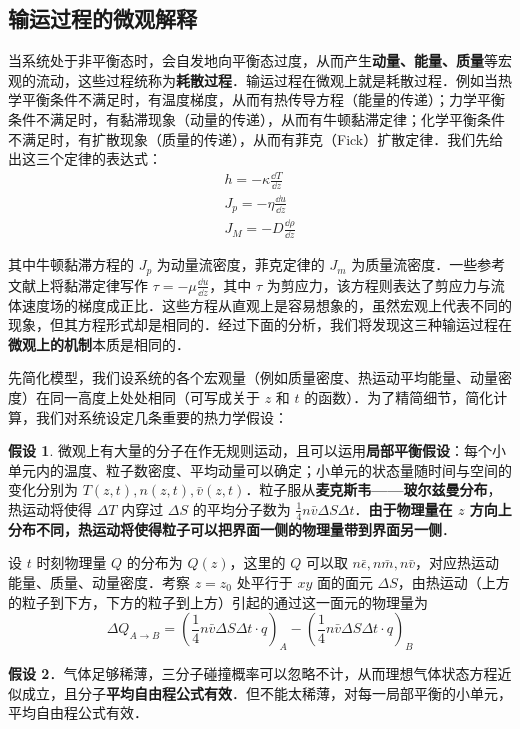 \subsection{输运过程的微观解释}
当系统处于非平衡态时，会自发地向平衡态过度，从而产生\textbf{动量、能量、质量}等宏观的流动，这些过程统称为\textbf{耗散过程}．输运过程在微观上就是耗散过程．例如当热学平衡条件不满足时，有温度梯度，从而有热传导方程（能量的传递）；力学平衡条件不满足时，有黏滞现象（动量的传递），从而有牛顿黏滞定律；化学平衡条件不满足时，有扩散现象（质量的传递），从而有菲克（Fick）扩散定律．我们先给出这三个定律的表达式：
\begin{align}
h=-\kappa \frac{\dd T}{\dd z}\\
J_p=-\eta \frac{\dd u}{\dd z}\\
J_M=-D\frac{\dd \rho}{\dd z}
\end{align}

其中牛顿黏滞方程的 $J_p$ 为动量流密度，菲克定律的 $J_m$ 为质量流密度．一些参考文献上将黏滞定律写作 $\tau = -\mu \frac{\dd u}{\dd z}$，其中 $\tau$ 为剪应力，该方程则表达了剪应力与流体速度场的梯度成正比．这些方程从直观上是容易想象的，虽然宏观上代表不同的现象，但其方程形式却是相同的．经过下面的分析，我们将发现这三种输运过程在\textbf{微观上的机制}本质是相同的．

先简化模型，我们设系统的各个宏观量（例如质量密度、热运动平均能量、动量密度）在同一高度上处处相同（可写成关于 $z$ 和 $t$ 的函数）．为了精简细节，简化计算，我们对系统设定几条重要的热力学假设：

\textbf{假设 1}. 微观上有大量的分子在作无规则运动，且可以运用\textbf{局部平衡假设}：每个小单元内的温度、粒子数密度、平均动量可以确定；小单元的状态量随时间与空间的变化分别为 $T(z,t),n(z,t),\bar v(z,t)$．粒子服从\textbf{麦克斯韦——玻尔兹曼分布}，热运动将使得 $\Delta T$ 内穿过 $\Delta S$ 的平均分子数为 $\frac{1}{4}n\bar v \Delta S\Delta t$．\textbf{由于物理量在 $z$ 方向上分布不同，热运动将使得粒子可以把界面一侧的物理量带到界面另一侧}．

设 $t$ 时刻物理量 $Q$ 的分布为 $Q(z)$，这里的 $Q$ 可以取 $n\bar\epsilon,n\bar m,n\bar v$，对应热运动能量、质量、动量密度．考察 $z=z_0$ 处平行于 $xy$ 面的面元 $\Delta S$，由热运动（上方的粒子到下方，下方的粒子到上方）引起的通过这一面元的物理量为
\begin{equation}
\Delta Q_{A\rightarrow B}=(\frac{1}{4}n\bar v \Delta S\Delta t\cdot q)_A-(\frac{1}{4}n\bar v \Delta S\Delta t\cdot q)_B
\end{equation}

\textbf{假设 2}．气体足够稀薄，三分子碰撞概率可以忽略不计，从而理想气体状态方程近似成立，且分子\textbf{平均自由程公式有效}．但不能太稀薄，对每一局部平衡的小单元，平均自由程公式有效．
